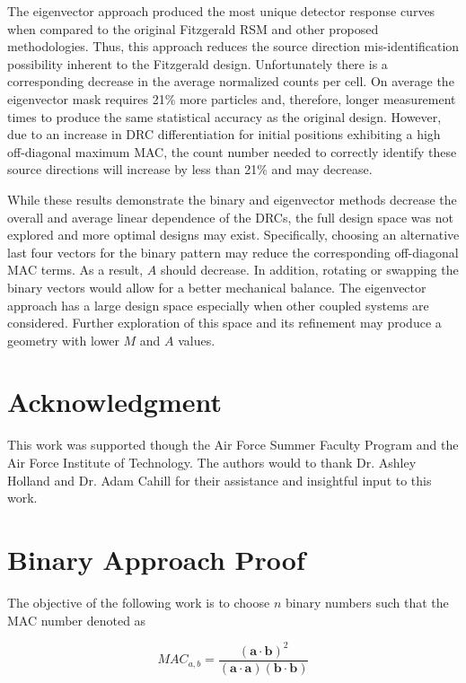 \documentclass[3p,times]{elsarticle}
\begin{document}
The eigenvector approach produced the most unique detector response curves when compared to the original Fitzgerald RSM and other proposed methodologies. 
Thus, this approach reduces the source direction mis-identification possibility inherent to the Fitzgerald design.
Unfortunately there is a corresponding decrease in the average normalized counts per cell.
On average the eigenvector mask requires 21\% more particles and, therefore, longer measurement times to produce the same statistical accuracy as the original design.
However, due to an increase in DRC differentiation for initial positions exhibiting a high off-diagonal maximum MAC, the count number needed to correctly identify these source directions will increase by less than 21\% and may decrease. 

While these results demonstrate the binary and eigenvector methods decrease the overall and average linear dependence of the DRCs, the full design space was not explored and more optimal designs may exist.  
Specifically, choosing an alternative last four vectors for the binary pattern may reduce the corresponding off-diagonal MAC terms.  
As a result, $A$ should decrease.  
In addition, rotating or swapping the binary vectors would allow for a better mechanical balance.  
The eigenvector approach has a large design space especially when other coupled systems are considered.  
Further exploration of this space and its refinement may produce a geometry with lower $M$ and $A$ values.

\section{Acknowledgment}
This work was supported though the Air Force Summer Faculty Program and the Air Force Institute of Technology.  
The authors would to thank Dr. Ashley Holland and Dr. Adam Cahill for their assistance and insightful input to this work.

\appendix

\section{Binary Approach Proof}
The objective of the following work is to choose $n$ binary numbers such that the MAC number denoted as 

\begin{equation}
MAC_{a,b}=\frac{\left(\mathbf{a}\cdot\mathbf{b}\right)^2}{\left(\mathbf{a}\cdot\mathbf{a}\right)\left(\mathbf{b}\cdot\mathbf{b}\right)}
\end{equation}
\end{document}
